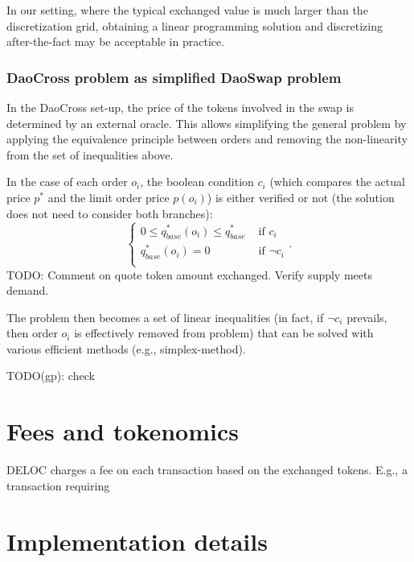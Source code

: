 \documentclass[11pt, reqno]{amsart}
\theoremstyle{definition}
\theoremstyle{remark}
\begin{document}
In our setting, where the typical exchanged value is much larger than the
discretization grid, obtaining a linear programming solution and
discretizing after-the-fact may be acceptable in practice.

\subsubsection{DaoCross problem as simplified DaoSwap problem}
In the DaoCross set-up, the price of the tokens involved in the swap is
determined by an external oracle.
This allows simplifying the general problem by applying the equivalence
principle between orders and removing the non-linearity from the set of
inequalities above.

In the case of each order $o_i$, the boolean condition $c_i$ (which compares
the actual price $p^*$ and the limit order price $p(o_i)$) is either verified
or not (the solution does not need to consider both branches):
\begin{equation}
	\begin{cases}
		0 \le q_{base}^*(o_i) \le q_{base}^* & \text{ if } c_i       \\
		q_{base}^*(o_i) = 0                & \text{ if } \lnot c_i \\
	\end{cases}.
\end{equation}
TODO: Comment on quote token amount exchanged. Verify supply meets demand.

The problem then becomes a set of linear inequalities (in fact, if $\lnot c_i$
prevails, then order $o_i$ is effectively removed from problem) that can be
solved with various efficient methods (e.g., simplex-method).

TODO(gp): check

\section{Fees and tokenomics}
DELOC charges a fee on each transaction based on the exchanged tokens.
E.g., a transaction requiring

\section{Implementation details}

\end{document}
